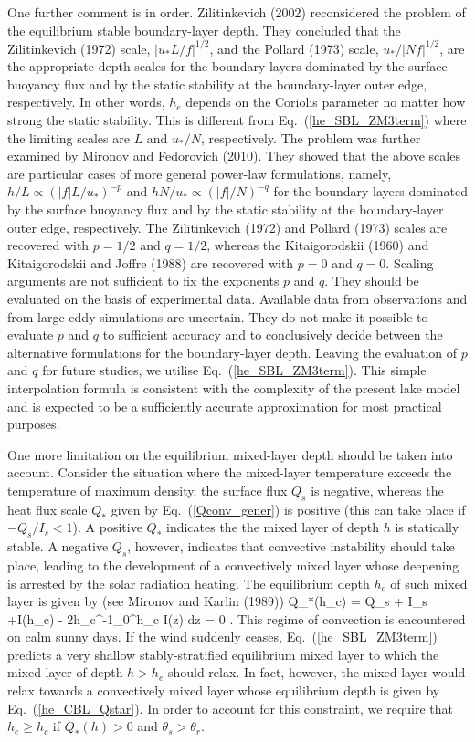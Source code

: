 One further comment is in order.
Zilitinkevich \etal (2002) reconsidered the problem of 
the equilibrium stable boundary-layer depth.
They concluded that the Zilitinkevich (1972) scale, 
$|u_*L/f|^{1/2}$, and the Pollard \etal (1973) scale,
$u_*/|Nf|^{1/2}$, are the appropriate depth scales for the 
boundary layers dominated by the surface buoyancy flux
and by the static stability at the boundary-layer outer edge, respectively.
In other words, $h_e$ depends on the Coriolis parameter 
no matter how strong the static stability.
This is different from Eq.~(\ref{he_SBL_ZM3term})
where the limiting scales are $L$ and $u_*/N$, respectively.
The problem was further examined by Mironov and Fedorovich (2010)\nocite{mironovfedo2010}.
They showed that the above scales are particular cases of more general power-law formulations,
namely, $h/L\propto (|f|L/u_*)^{-p}$ and $hN/u_*\propto (|f|/N)^{-q}$ for the 
boundary layers dominated by the surface buoyancy flux 
and by the static stability at the boundary-layer outer edge,
respectively. The Zilitinkevich (1972) and Pollard \etal (1973) scales 
are recovered with $p=1/2$ and $q=1/2$, 
whereas the Kitaigorodskii (1960) and Kitaigorodskii and Joffre (1988) 
are recovered with $p=0$ and $q=0$. 
Scaling arguments are not sufficient to fix the exponents $p$ and $q$.
They should be evaluated on the basis of experimental data.
Available data from observations and from large-eddy simulations are uncertain.
They do not make it possible to evaluate $p$ and $q$ to sufficient accuracy 
and to conclusively decide between the alternative formulations for the boundary-layer depth.
Leaving the evaluation of $p$ and $q$ for future studies, we utilise Eq.~(\ref{he_SBL_ZM3term}).
This simple interpolation formula is consistent with the complexity of the present lake model
and is expected to be a sufficiently accurate approximation for most practical purposes.

One more limitation on the equilibrium mixed-layer depth should be taken into account.
Consider the situation where
the mixed-layer temperature exceeds the temperature of maximum density,
the surface flux $Q_s$ is negative, whereas  
the heat flux scale $Q_*$ given by Eq.~(\ref{Qconv_gener}) is positive 
(this can take place if $-Q_s/I_s<1$).
A positive $Q_*$ indicates the the mixed layer of depth $h$ 
is statically stable. 
A negative $Q_s$, however, indicates that convective instability 
should take place, leading to the development of a convectively mixed layer 
whose deepening is arrested by the solar radiation heating.
The equilibrium depth $h_c$ of such mixed layer is given by
(see \eg Mironov and Karlin (1989)) 
%
\beq\label{he_CBL_Qstar}
Q_*(h_c) = Q_s + I_s +I(h_c) - 2h_c^{-1}\int_0^{h_c} I(z) dz = 0 .
\eeq
%
This regime of convection is encountered on calm sunny days.
If the wind suddenly ceases, Eq.~(\ref{he_SBL_ZM3term}) predicts a very shallow
stably-stratified equilibrium mixed layer to which the mixed layer  
of depth $h>h_e$ should relax.
In fact, however, the mixed layer would relax towards a convectively mixed layer
whose equilibrium depth is given by Eq.~(\ref{he_CBL_Qstar}).
In order to account for this constraint, 
we require that $h_e\ge h_c$ if $Q_*(h)>0$ and $\theta_s>\theta_r$. 


